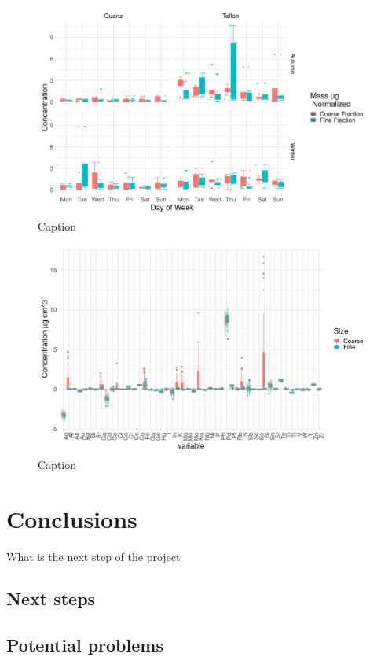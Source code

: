 \documentclass{nwureport}
\begin{document}
\begin{figure}[!htb]
    \centering
    \includegraphics[width=\textwidth]{images/TS_FilterDaySizeSeason_mass.png}
    \caption{Caption}
    \label{fig:summary}
\end{figure}


\begin{figure}[!htb]
    \centering
    \includegraphics[width=\textwidth]{images/xrf.png}
    \caption{Caption}
    \label{fig:summary}
\end{figure}


\chapter{Conclusions}

What is the next step of the project 

\section{Next steps}

\section{Potential problems}


\begin{spacing}{0.3}
\linespread{0.8} \normalsize

\end{spacing}
\end{document}
